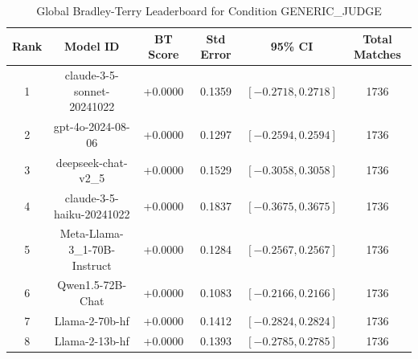 \begin{table}[ht]
\centering
\caption{Global Bradley-Terry Leaderboard for Condition \textsc{GENERIC_JUDGE}}
\label{tab:leaderboard_generic_judge}
\begin{tabular}{cccccc}
\hline
\textbf{Rank} & \textbf{Model ID} & \textbf{BT Score} & \textbf{Std Error} & \textbf{95\% CI} & \textbf{Total Matches} \\
\hline
1 & claude-3-5-sonnet-20241022 & +0.0000 & 0.1359 & $[-0.2718, 0.2718]$ & 1736 \\
2 & gpt-4o-2024-08-06 & +0.0000 & 0.1297 & $[-0.2594, 0.2594]$ & 1736 \\
3 & deepseek-chat-v2\_5 & +0.0000 & 0.1529 & $[-0.3058, 0.3058]$ & 1736 \\
4 & claude-3-5-haiku-20241022 & +0.0000 & 0.1837 & $[-0.3675, 0.3675]$ & 1736 \\
5 & Meta-Llama-3\_1-70B-Instruct & +0.0000 & 0.1284 & $[-0.2567, 0.2567]$ & 1736 \\
6 & Qwen1.5-72B-Chat & +0.0000 & 0.1083 & $[-0.2166, 0.2166]$ & 1736 \\
7 & Llama-2-70b-hf & +0.0000 & 0.1412 & $[-0.2824, 0.2824]$ & 1736 \\
8 & Llama-2-13b-hf & +0.0000 & 0.1393 & $[-0.2785, 0.2785]$ & 1736 \\
\hline
\end{tabular}
\end{table}
